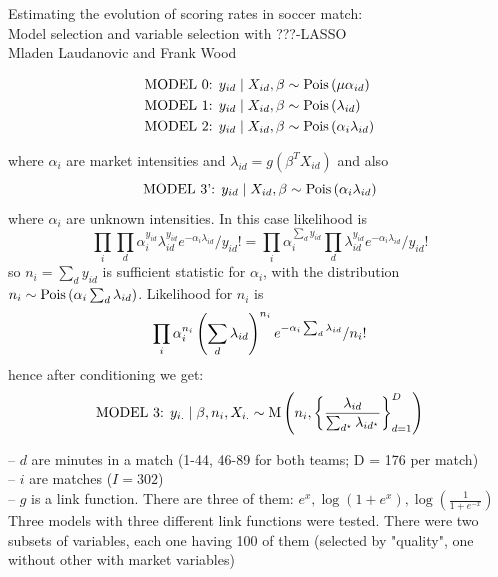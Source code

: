 \documentclass[12pt, letter]{article}
\begin{document}
 \begin{center}
 {\Large Estimating the evolution of scoring rates in soccer match: \\ Model selection and variable
 selection  with ???-LASSO}\\[1cm]
 {Mladen Laudanovic and Frank Wood}
 \end{center}
 

% 

%

%

\begin{equation*}
\begin{split}
\text{MODEL 0:  }& y_{id}\mid X_{id}, \beta \sim \mathrm{Pois}\zag{\mu \alpha_{id}}\\
\text{MODEL 1:  }& y_{id}\mid X_{id}, \beta \sim \mathrm{Pois}\zag{\lambda_{id}}\\
\text{MODEL 2:  }& y_{id}\mid X_{id}, \beta \sim \mathrm{Pois}\zag{\alpha_{i}\lambda_{id}}\\
\end{split}
\end{equation*}

where $\alpha_{i}$ are market intensities  and $\lambda_{id} = g(\beta^T X_{id})$ and also 
$$\text{MODEL 3':  } y_{id}\mid X_{id}, \beta \sim \mathrm{Pois}\zag{\alpha_{i}\lambda_{id}}$$
where $\alpha_{i}$ are unknown intensities. In this case likelihood is 
$$ \prod_i \prod_d \alpha_{i}^{y_{id}}\lambda_{id}^{y_{id}} e^{-\alpha_{i}\lambda_{id}}/y_{id}! = 
\prod_i \alpha_{i}^{\sum_d y_{id}} \prod_d \lambda_{id}^{y_{id}} e^{-\alpha_{i}\lambda_{id}}/y_{id}!$$ so $n_i = \sum_d y_{id}$ is sufficient statistic for $\alpha_i$, with the distribution $n_i \sim \mathrm{Pois}\zag{\alpha_{i}\sum_d\lambda_{id}}$. Likelihood for $n_i$ is  
$$ \prod_i \alpha_{i}^{n_{i}}\zag{\sum_d\lambda_{id}}^{n_{i}} e^{-\alpha_{i}\sum_d\lambda_{id}}/n_{i}! $$ hence after conditioning we get:
$$\text{MODEL 3:  } y_{i.}\mid \beta, n_i,  X_{i.}\sim \mathrm{M}
    \zag{n_i, \zagv{\frac{\lambda_{id}}{\sum_{d^\star}\lambda_{id^\star}}}_{d=1}^D}$$
 

   -- $d$ are minutes in a match (1-44, 46-89 for both teams; D = 176 per match)\\
   -- $i$ are matches ($I=302$)\\
   -- $g$ is a link function. There are three of them: $e^x, \log(1+e^x), \log(\frac{1}{1+e^{-x}})$\\
 
 Three models with three different link functions were tested. There were two subsets of variables, each one having 100 of them (selected by "quality", one without other with market variables)
 
\end{document}
